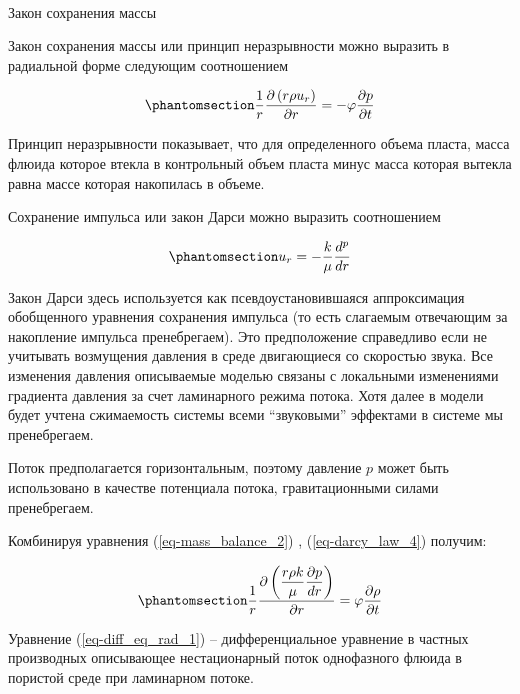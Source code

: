 \documentclass[
  russian,
  letterpaper,
  DIV=11,
  numbers=noendperiod,
  oneside]{scrartcl}
\makeatletter
\let\oldparagraph\paragraph
\renewcommand{\paragraph}{
    \@ifstar
      \xxxParagraphStar
      \xxxParagraphNoStar
  }
\newcommand{\xxxParagraphStar}[1]{\oldparagraph*{#1}\mbox{}}
\newcommand{\xxxParagraphNoStar}[1]{\oldparagraph{#1}\mbox{}}
\makeatother
\begin{document}
\paragraph{Закон сохранения
массы}\label{ux437ux430ux43aux43eux43d-ux441ux43eux445ux440ux430ux43dux435ux43dux438ux44f-ux43cux430ux441ux441ux44b-1}

Закон сохранения массы или принцип неразрывности можно выразить в
радиальной форме следующим соотношением

\begin{equation}\phantomsection\label{eq-mass_balance_2}{ 
\frac{1}{r}\frac{\partial\left(r\rho u_r\right)}{\partial r}=-\varphi\frac{\partial p}{\partial t}
}\end{equation}

Принцип неразрывности показывает, что для определенного объема пласта,
масса флюида которое втекла в контрольный объем пласта минус масса
которая вытекла равна массе которая накопилась в объеме.

Сохранение импульса или закон Дарси можно выразить соотношением

\begin{equation}\phantomsection\label{eq-darcy_law_4}{ 
 u_r=-\frac{k}{\mu}\frac{d^p}{dr}
}\end{equation}

Закон Дарси здесь используется как псевдоустановившаяся аппроксимация
обобщенного уравнения сохранения импульса (то есть слагаемым отвечающим
за накопление импульса пренебрегаем). Это предположение справедливо если
не учитывать возмущения давления в среде двигающиеся со скоростью звука.
Все изменения давления описываемые моделью связаны с локальными
изменениями градиента давления за счет ламинарного режима потока. Хотя
далее в модели будет учтена сжимаемость системы всеми ``звуковыми''
эффектами в системе мы пренебрегаем.

Поток предполагается горизонтальным, поэтому давление \(p\) может быть
использовано в качестве потенциала потока, гравитационными силами
пренебрегаем.

Комбинируя уравнения (\ref{eq-mass_balance_2}) , (\ref{eq-darcy_law_4})
получим:

\begin{equation}\phantomsection\label{eq-diff_eq_rad_1}{ 
\frac{1}{r}\frac{\partial\left( \dfrac{r\rho k}{\mu}\dfrac{\partial p}{dr}\right)}{\partial r}=\varphi\frac{\partial \rho}{\partial t}
}\end{equation}

Уравнение (\ref{eq-diff_eq_rad_1}) -- дифференциальное уравнение в
частных производных описывающее нестационарный поток однофазного флюида
в пористой среде при ламинарном потоке.
\end{document}
